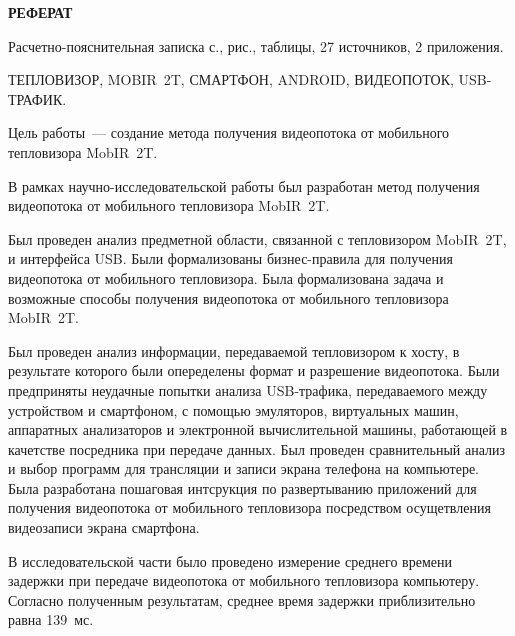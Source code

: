 \begin{center}
	\LARGE\bfseries{РЕФЕРАТ}
\end{center}

Расчетно-пояснительная записка \pageref{LastPage} с., \totalfigures{} рис., \totaltables{} таблицы, 27 источников, 2 приложения.

ТЕПЛОВИЗОР, MOBIR~2T, СМАРТФОН, ANDROID, ВИДЕОПОТОК, USB-ТРАФИК.

Цель работы~--- создание метода получения видеопотока от мобильного тепловизора MobIR~2T.

В рамках научно-исследовательской работы был разработан метод получения видеопотока от мобильного тепловизора MobIR~2T.

Был проведен анализ предметной области, связанной с тепловизором MobIR~2T, и интерфейса USB. Были формализованы бизнес-правила для получения видеопотока от мобильного тепловизора. Была формализована задача и возможные способы получения видеопотока от мобильного тепловизора MobIR~2T.

Был проведен анализ информации, передаваемой тепловизором к хосту, в результате которого были опеределены формат и разрешение видеопотока.
Были предприняты неудачные попытки анализа USB-трафика, передаваемого между устройством и смартфоном, с помощью эмуляторов, виртуальных машин, аппаратных анализаторов и электронной вычислительной машины, работающей в качетстве посредника при передаче данных.
Был проведен сравнительный анализ и выбор программ для трансляции и записи экрана телефона на компьютере.
Была разработана пошаговая интсрукция по развертыванию приложений для получения видеопотока от мобильного тепловизора посредством осущетвления видеозаписи экрана смартфона.

В исследовательской части было проведено измерение среднего времени задержки при передаче видеопотока от мобильного тепловизора компьютеру.
Согласно полученным результатам, среднее время задержки приблизительно равна 139~мс.

